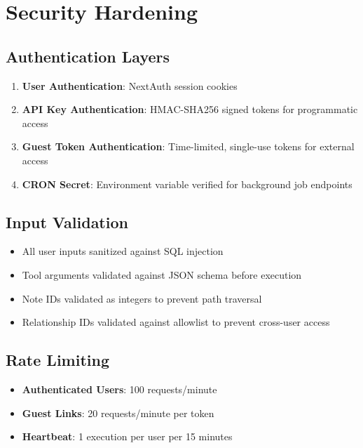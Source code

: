 \section{Security Hardening}

\subsection{Authentication Layers}

\begin{enumerate}
    \item \textbf{User Authentication}: NextAuth session cookies
    \item \textbf{API Key Authentication}: HMAC-SHA256 signed tokens for programmatic access
    \item \textbf{Guest Token Authentication}: Time-limited, single-use tokens for external access
    \item \textbf{CRON Secret}: Environment variable verified for background job endpoints
\end{enumerate}

\subsection{Input Validation}

\begin{itemize}
    \item All user inputs sanitized against SQL injection
    \item Tool arguments validated against JSON schema before execution
    \item Note IDs validated as integers to prevent path traversal
    \item Relationship IDs validated against allowlist to prevent cross-user access
\end{itemize}

\subsection{Rate Limiting}

\begin{itemize}
    \item \textbf{Authenticated Users}: 100 requests/minute
    \item \textbf{Guest Links}: 20 requests/minute per token
    \item \textbf{Heartbeat}: 1 execution per user per 15 minutes
\end{itemize}
